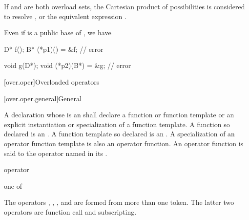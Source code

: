 \pnum
\begin{note}
If  and  are both overload sets,
the Cartesian product of possibilities is considered
to resolve , or the equivalent expression .
\end{note}

\pnum
{}%
\begin{note}
Even if  is a public base of ,
we have
\begin{codeblock}
D* f();
B* (*p1)() = &f;                // error

void g(D*);
void (*p2)(B*) = &g;            // error
\end{codeblock}
\end{note}

[over.oper]{Overloaded operators}%

[over.oper.general]{General}%
%
%

\pnum
{}%
A declaration
whose  is an 
shall declare a function or function template or
an explicit instantiation or specialization of a function template.
A function so declared is an .
A function template so declared is
an .
A specialization of an operator function template is also an operator function.
An operator function is said to
the operator named in its
.

\begin{bnf}
\br
     operator
\end{bnf}

\begin{bnf}
\obeyspaces
{} \textnormal{one of}\br
    \br
    \terminal{\~        !        +        -        *        /        \%        \caret{}        \&}\br
    \terminal{|        =        +=       -=       *=       /=       \%=       \caret{}=       \&=}\br
    \terminal{|=       ==       !=       <        >        <=       >=       <=>      \&\&}\br
    \terminal{||       <<       >>       <<=      >>=      ++       --       ,}\br
\end{bnf}
\begin{note}
The operators
,
,
\tcode{()},
and
\tcode{[]}
are formed from more than one token.
The latter two operators are function call
and subscripting.
\end{note}
%
%


